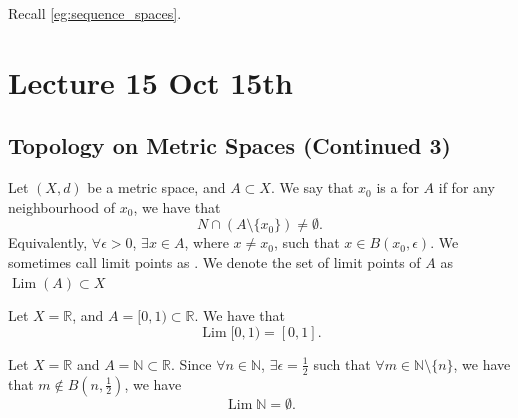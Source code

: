 \documentclass[notoc,notitlepage]{tufte-book}
\DeclareMathOperator{\Lim}{Lim }
\begin{document}
Recall \cref{eg:sequence_spaces}.



\chapter{Lecture 15 Oct 15th}%
\label{chp:lecture_15_oct_15th}

\section{Topology on Metric Spaces (Continued 3)}%
\label{sec:topology_on_metric_spaces_continued_3}

\begin{defn}\label{defn:limit_points}
  Let $(X, d)$ be a metric space, and $A \subset X$. We say that $x_0$ is a  for $A$ if for any neighbourhood of $x_0$, we have that
  \begin{equation*}
    N \cap \left( A \setminus \{ x_0 \} \right) \neq \emptyset.
  \end{equation*}
  Equivalently, $\forall \epsilon > 0$, $\exists x \in A$, where $x \neq x_0$, such that $x \in B(x_0, \epsilon)$. We sometimes call limit points as . We denote the set of limit points of $A$ as $\Lim(A) \subset X$ 
\end{defn}

\begin{eg}
  Let $X = \mathbb{R}$, and $A = [0, 1) \subset \mathbb{R}$. We have that
  \begin{equation*}
    \Lim[0, 1) = [ 0, 1 ].
  \end{equation*}
\end{eg}

\begin{eg}
  Let $X = \mathbb{R}$ and $A = \mathbb{N} \subset \mathbb{R}$. Since $\forall n \in \mathbb{N}$, $\exists \epsilon = \frac{1}{2}$ such that $\forall m \in \mathbb{N} \setminus \{ n \}$, we have that $m \notin B\left(n, \frac{1}{2}\right)$, we have
  \begin{equation*}
    \Lim \mathbb{N} = \emptyset.
  \end{equation*}
\end{eg}
\end{document}
